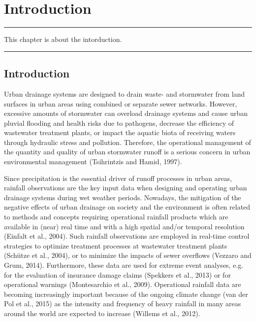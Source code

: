 \documentclass{ctuthesis}\usepackage[]{graphicx}\usepackage[]{color}
\begin{document}
        \maketitle
        
        


\chapter{Introduction} \label{chap1}

\rule{\textwidth}{0.4pt}
This chapter is about the intorduction. \newline
\rule[0.2cm]{\textwidth}{0.4pt}


\section{Introduction}

Urban drainage systems are designed to drain waste- and stormwater from land surfaces in urban areas using combined or separate sewer networks. However, excessive amounts of stormwater can overload drainage systems and cause urban pluvial flooding and health risks due to pathogens, decrease the efficiency of wastewater treatment plants, or impact the aquatic biota of receiving waters through hydraulic stress and pollution. Therefore, the operational management of the quantity and quality of urban stormwater runoff is a serious concern in urban environmental management (Tsihrintzis and Hamid, 1997).

Since precipitation is the essential driver of runoff processes in urban areas, rainfall observations are the key input data when designing and operating urban drainage systems during wet weather periods. Nowadays, the mitigation of the negative effects of urban drainage on society and the environment is often related to methods and concepts requiring operational rainfall products which are available in (near) real time and with a high spatial and/or temporal resolution (Einfalt et al., 2004). Such rainfall observations are employed in real-time control strategies to optimize treatment processes at wastewater treatment plants (Schütze et al., 2004), or to minimize the impacts of sewer overflows (Vezzaro and Grum, 2014). Furthermore, these data are used for extreme event analyses, e.g. for the evaluation of insurance damage claims (Spekkers et al., 2013) or for operational warnings (Montesarchio et al., 2009). Operational rainfall data are becoming increasingly important because of the ongoing climate change (van der Pol et al., 2015) as the intensity and frequency of heavy rainfall in many areas around the world are expected to increase (Willems et al., 2012). 
\end{document}

